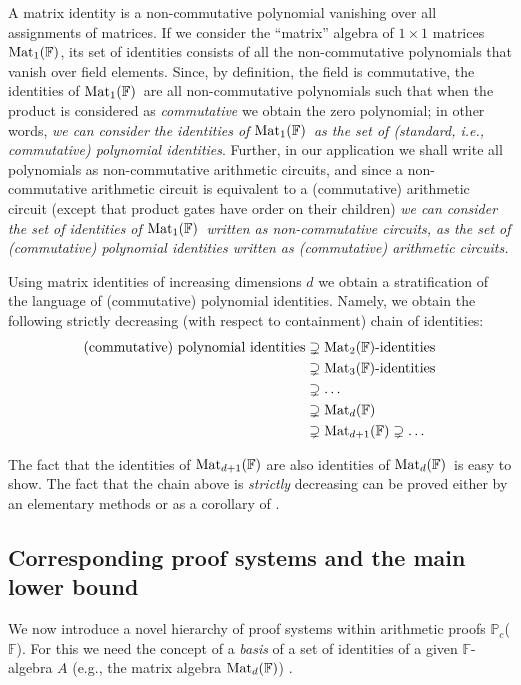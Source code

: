 \documentclass[12pt,reqno]{article}
\newcommand\F{\ensuremath{\mathbb F}}
\newcommand\PP{{\mathbb P}}
\newcommand\PC{\ensuremath{\PP_c}}
\newcommand{\matd}{{\ensuremath{{\rm Mat}_d(\F)}}}
\newcommand{\mattwo}{{\ensuremath{{\rm Mat}_2(\F)}}}
\newcommand{\matone}{{\ensuremath{{\rm Mat}_1(\F)}}}
\newcommand{\matthree}{{\ensuremath{{\rm Mat}_3(\F)}}}
\begin{document}
A matrix identity is a non-commutative polynomial vanishing over all assignments of matrices. If we consider the ``matrix'' algebra of $1 \times 1$ matrices \matone, its set of identities consists of all the non-commutative polynomials that vanish over field elements. Since, by definition, the field is commutative, the identities of \matone\ are all non-commutative polynomials such that when the product is considered as \emph{commutative} we obtain the zero polynomial; in other words, \textit{we can consider the identities of \matone\ as the set of (standard, i.e., commutative) polynomial identities}. Further, in our application we shall write all polynomials as non-commutative arithmetic circuits, and since a non-commutative arithmetic circuit is equivalent to a (commutative) arithmetic circuit (except that product gates have order on their children) \textit{we can consider the set of identities of \matone\ written as non-commutative circuits, as the set of (commutative) polynomial identities written as (commutative) arithmetic circuits.}

Using matrix identities of increasing dimensions $d$ we obtain a stratification of the language of (commutative) polynomial identities. Namely, we obtain the following strictly decreasing (with respect to containment) chain of identities:
\begin{align}\notag
\hbox{(commutative) polynomial identities} & \supsetneq \mattwo\hbox{-identities} \\ \notag
        &\supsetneq \hbox{\matthree-identities} \\ \label{eq:chain}
        &\supsetneq \ldots \\ \notag
        &\supsetneq \matd \\ \notag
        &\supsetneq {\rm Mat}_{d+1}(\F) \supsetneq\ldots\notag
\end{align}

The fact that the identities of  ${\rm Mat}_{d+1}(\F)$ are also identities of \matd\ is easy to show. The fact that the chain above is  \textit{strictly} decreasing  can be proved  either by an elementary methods \cite{Jer14-personal_communication} or as a corollary of \cite{AL50}.

\subsection{Corresponding proof systems and the main lower bound }\label{sec:ovrv:proof_system_for_matrix_identities}

We now introduce a novel  hierarchy of proof systems within arithmetic proofs \PC(\F).
For this we need the concept of a \textit{basis} of a set of identities of a given \F-algebra $A$ (e.g., the matrix algebra \matd) .
\end{document}
